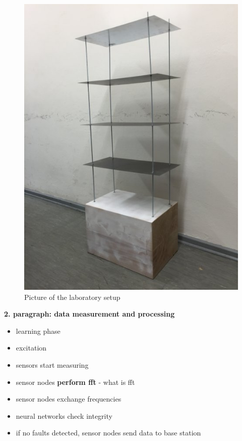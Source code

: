 \documentclass[12pt,a4paper]{scrartcl}
\begin{document}
\begin{figure}[h!]
    \centering
    \includegraphics[scale=0.3]{figures/teststructure.jpg}
    \caption{Picture of the laboratory setup}
    \label{fig:teststructure}
\end{figure}


\textbf{2. paragraph: data measurement and processing}

\begin{itemize}
\item learning phase
\item excitation
\item sensors start measuring
\item sensor nodes \textbf{perform fft} - what is fft
\item sensor nodes exchange frequencies
\item neural networks check integrity
\item if no faults detected, sensor nodes send data to base station
\end{itemize}
\end{document}
